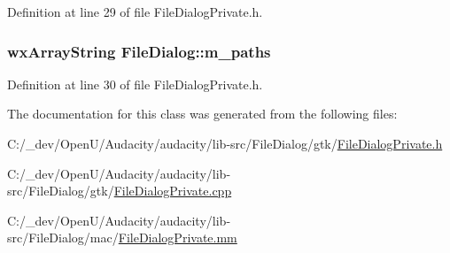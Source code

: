 Definition at line 29 of file File\+Dialog\+Private.\+h.

\subsubsection[{\texorpdfstring{m\+\_\+paths}{m_paths}}]{\setlength{\rightskip}{0pt plus 5cm}wx\+Array\+String File\+Dialog\+::m\+\_\+paths\hspace{0.3cm}{\ttfamily [protected]}}\hypertarget{class_file_dialog_aa12fc9dac8d4db43d2fc16e2ec676c78}{}\label{class_file_dialog_aa12fc9dac8d4db43d2fc16e2ec676c78}


Definition at line 30 of file File\+Dialog\+Private.\+h.



The documentation for this class was generated from the following files\+:\begin{DoxyCompactItemize}
\item 
C\+:/\+\_\+dev/\+Open\+U/\+Audacity/audacity/lib-\/src/\+File\+Dialog/gtk/\hyperlink{gtk_2_file_dialog_private_8h}{File\+Dialog\+Private.\+h}\item 
C\+:/\+\_\+dev/\+Open\+U/\+Audacity/audacity/lib-\/src/\+File\+Dialog/gtk/\hyperlink{gtk_2_file_dialog_private_8cpp}{File\+Dialog\+Private.\+cpp}\item 
C\+:/\+\_\+dev/\+Open\+U/\+Audacity/audacity/lib-\/src/\+File\+Dialog/mac/\hyperlink{_file_dialog_private_8mm}{File\+Dialog\+Private.\+mm}\end{DoxyCompactItemize}
